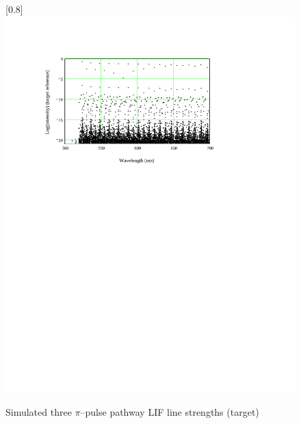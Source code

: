 \begin{figure}
\scalebox{0.8}[0.8]{
\includegraphics[bb=0 480 489 752]
{PI_79/PI_79.pdf}
}
\caption[Simulated three $\pi$--pulse pathway LIF line strengths (target)]{Simulated three $\pi$--pulse pathway LIF line strengths (target)}
\label{PI_79}
\end{figure}
